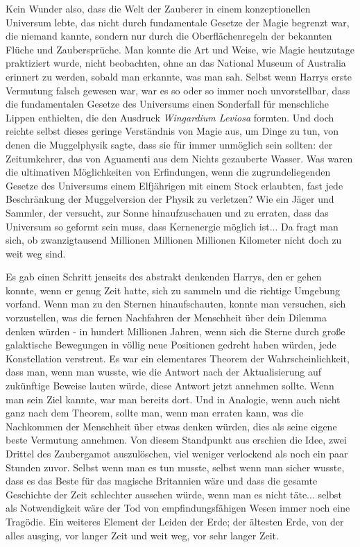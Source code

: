 Kein Wunder also, dass die Welt der Zauberer in einem konzeptionellen Universum
lebte, das nicht durch fundamentale Gesetze der Magie begrenzt war, die niemand
kannte, sondern nur durch die Oberflächenregeln der bekannten Flüche und
Zaubersprüche. Man konnte die Art und Weise, wie Magie heutzutage praktiziert
wurde, nicht beobachten, ohne an das National Museum of Australia erinnert zu
werden, sobald man erkannte, was man sah. Selbst wenn Harrys erste Vermutung
falsch gewesen war, war es so oder so immer noch unvorstellbar, dass die
fundamentalen Gesetze des Universums einen Sonderfall für menschliche Lippen
enthielten, die den Ausdruck \emph{\glqq Wingardium Leviosa\grqq{} } formten.
Und doch reichte selbst dieses geringe Verständnis von Magie aus, um Dinge zu
tun, von denen die Muggelphysik sagte, dass sie für immer unmöglich sein
sollten: der Zeitumkehrer, das von Aguamenti aus dem Nichts gezauberte Wasser.
Was waren die ultimativen Möglichkeiten von Erfindungen, wenn die
zugrundeliegenden Gesetze des Universums einem Elfjährigen mit einem Stock
erlaubten, fast jede Beschränkung der Muggelversion der Physik zu verletzen? Wie
ein Jäger und Sammler, der versucht, zur Sonne hinaufzuschauen und zu erraten,
dass das Universum so geformt sein muss, dass Kernenergie möglich ist... Da
fragt man sich, ob zwanzigtausend Millionen Millionen Millionen Kilometer nicht
doch zu weit weg sind.

Es gab einen Schritt jenseits des abstrakt denkenden Harrys, den er gehen
konnte, wenn er genug Zeit hatte, sich zu sammeln und die richtige Umgebung
vorfand. Wenn man zu den Sternen hinaufschauten, konnte man versuchen, sich
vorzustellen, was die fernen Nachfahren der Menschheit über dein Dilemma denken
würden - in hundert Millionen Jahren, wenn sich die Sterne durch große
galaktische Bewegungen in völlig neue Positionen gedreht haben würden, jede
Konstellation verstreut. Es war ein elementares Theorem der Wahrscheinlichkeit,
dass man, wenn man wusste, wie die Antwort nach der Aktualisierung auf
zukünftige Beweise lauten würde, diese Antwort jetzt annehmen sollte. Wenn man
sein Ziel kannte, war man bereits dort. Und in Analogie, wenn auch nicht ganz
nach dem Theorem, sollte man, wenn man erraten kann, was die Nachkommen der
Menschheit über etwas denken würden, dies als seine eigene beste Vermutung
annehmen. Von diesem Standpunkt aus erschien die Idee, zwei Drittel des
Zaubergamot auszulöschen, viel weniger verlockend als noch ein paar Stunden
zuvor. Selbst wenn man es tun musste, selbst wenn man sicher wusste, dass es das
Beste für das magische Britannien wäre und dass die gesamte Geschichte der Zeit
schlechter aussehen würde, wenn man es nicht täte... selbst als Notwendigkeit
wäre der Tod von empfindungsfähigen Wesen immer noch eine Tragödie. Ein weiteres
Element der Leiden der Erde; der ältesten Erde, von der alles ausging, vor
langer Zeit und weit weg, vor sehr langer Zeit.

